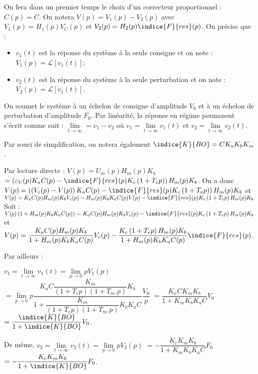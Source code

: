 On fera dans un premier temps le choix d'un correcteur proportionnel : $C(p)=C$.
On notera $V(p)=V_1 (p)-V_2 (p)$ avec $V_1 (p)= H_1 (p) V_C (p)$ et $V_2 (p)=H_2 (p) \indice{F}{res}(p)$. On précise que :
\begin{itemize}
    \item $v_1 (t)$ est la réponse du système à la seule consigne et on note : $V_1 (p)=\mathcal{L}\left[v_1 (t)\right] $;
    \item $v_2 (t)$ est la réponse du système à la seule perturbation et on note : $V_2 (p)=\mathcal{L}\left[v_1 (t)\right]$.
\end{itemize}
On soumet le système à un échelon de consigne d'amplitude $V_0$ et à un échelon de perturbation d'amplitude $F_0$. Par linéarité, la réponse en régime permanent s'écrit comme suit :
$\lim\limits_{t\to \infty} = v_1 - v_2$ où $v_1=\lim\limits_{t\to \infty}v_1(t)$ et $v_2=\lim\limits_{t\to \infty}v_2(t)$.

Par souci de simplification, on notera également $\indice{K}{BO}=CK_a K_b K_m$.

\ifprof
\begin{corrige}
Par lecture directe : $V(p)=U_m(p)H_m(p)K_b$ $=\left(\varepsilon_V(p) K_a C(p) - \indice{F}{res}(p)K_c\left(1+T_e p\right)\right) H_m(p)K_b$.
On a donc $V(p)=\left(\left(V_c(p) - V(p) \right) K_a C(p) - \indice{F}{res}(p)K_c\left(1+T_e p\right)\right) H_m(p)K_b$ et $V(p)=K_a C(p)H_m(p)K_bV_c(p) - H_m(p)K_bK_a C(p) V(p)  - \indice{F}{res}(p)K_c\left(1+T_e p\right)H_m(p)K_b$
Soit : 
$V(p)\left(1+ H_m(p)K_bK_a C(p)\right)  =K_a C(p)H_m(p)K_bV_c(p) - \indice{F}{res}(p)K_c\left(1+T_e p\right)H_m(p)K_b$ et 
$V(p) =\dfrac{K_a C(p)H_m(p)K_b}{1+ H_m(p)K_bK_a C(p)}V_c(p) -\dfrac{K_c\left(1+T_e p\right)H_m(p)K_b}{1+ H_m(p)K_bK_a C(p)} \indice{F}{res}(p)$.

Par ailleurs : 

$v_1=\lim\limits_{t\to \infty}v_1(t)=\lim\limits_{p\to0} p V_1(p) $ $=\lim\limits_{p\to0} p   \dfrac{K_a C \dfrac{K_m}{\left(1+T_e p\right) \left(1+T_m.p\right) }K_b}{1+ \dfrac{K_m}{\left(1+T_e p\right) \left(1+T_m.p\right) }K_bK_a C} \dfrac{V_0}{p}$
 $=\dfrac{K_a C K_m K_b}{1+ K_mK_bK_a C} V_0$  $=\dfrac{\indice{K}{BO}}{1+ \indice{K}{BO}} V_0$.
 
De même, $v_2=\lim\limits_{t\to \infty}v_2(t)=\lim\limits_{p\to0} p V_2(p) $
$=-\dfrac{K_c K_mK_b}{1+ K_mK_bK_a C} F_0$ $=-\dfrac{K_c K_mK_b}{1+ \indice{K}{BO}}F_0$.
\end{corrige}
\else
\fi

